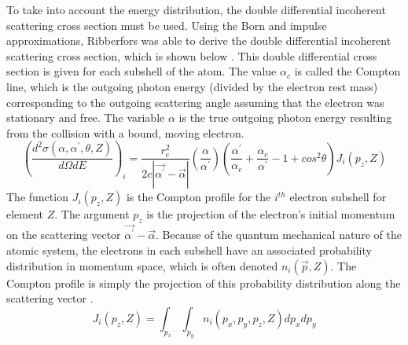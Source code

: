To take into account the energy distribution, the double differential
incoherent scattering cross section must be used. Using the Born and impulse
approximations, Ribberfors was able to derive the double differential
incoherent scattering cross section, which is shown below 
\citep{ribberfors_x-ray_1983}. This double differential cross section is given 
for each subshell of the atom. The value $\alpha_c$ is called the Compton line, 
which is the outgoing photon energy (divided by the electron rest mass) 
corresponding to the outgoing scattering angle assuming that the electron was 
stationary and free. The variable $\alpha$ is the true outgoing photon 
energy resulting from the collision with a bound, moving electron.
\begin{equation}
  \left(\frac{d^2\sigma(\alpha,\alpha^{'},\theta,Z)}{d\Omega dE}\right)_i = 
  \frac{r_e^2}{2c\left|\vec{\alpha^{'}} - 
    \vec{\alpha}\right|} \left(\frac{\alpha}{\alpha^{'}}\right) 
  \left(\frac{\alpha^{'}}{\alpha_c} + \frac{\alpha_c}{\alpha^{'}} - 1 + 
  cos^2\theta \right) J_i(p_z,Z)
\end{equation}
The function $J_i(p_z,Z)$ is the Compton profile for the $i^{th}$ electron 
subshell for element $Z$. The argument $p_z$ is the projection of the 
electron's initial momentum on the scattering vector 
$\vec{\alpha^{'}} - \vec{\alpha}$. Because of the quantum mechanical nature of 
the atomic system, the electrons in each subshell have an associated 
probability distribution in momentum space, which is often denoted 
$n_i(\vec{p},Z)$. The Compton profile is simply the projection of this 
probability distribution along the scattering vector 
\citep{cooper_compton_1985}.
\begin{equation}
  J_i(p_z,Z) = \int_{p_x} \int_{p_y} n_i(p_x,p_y,p_z,Z)dp_xdp_y
\end{equation}

